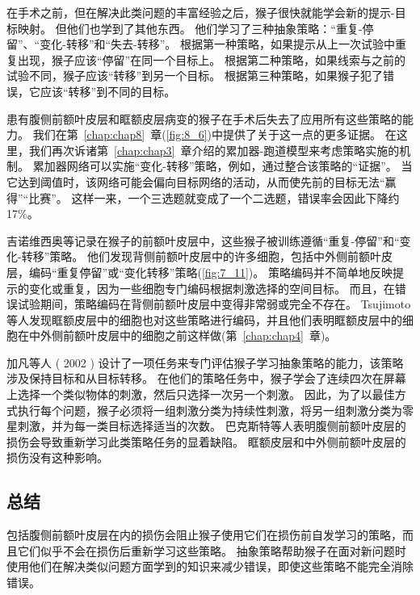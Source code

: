 在手术之前，但在解决此类问题的丰富经验之后，猴子很快就能学会新的提示-目标映射。
但他们也学到了其他东西。 他们学习了三种抽象策略：“重复-停留”、“变化-转移”和“失去-转移”。
根据第一种策略，如果提示从上一次试验中重复出现，猴子应该“停留”在同一个目标上。
根据第二种策略，如果线索与之前的试验不同，猴子应该“转移”到另一个目标。
根据第三种策略，如果猴子犯了错误，它应该“转移”到不同的目标。
\par


患有腹侧前额叶皮层和眶额皮层病变的猴子在手术后失去了应用所有这些策略的能力\cite{bussey2001role}。
我们在第~\ref{chap:chap8}~章(\ref{fig:8_6})中提供了关于这一点的更多证据。
在这里，我们再次诉诸第~\ref{chap:chap3}~章介绍的累加器-跑道模型来考虑策略实施的机制。 
累加器网络可以实施“变化-转移”策略，例如，通过整合该策略的“证据”。
当它达到阈值时，该网络可能会偏向目标网络的活动，从而使先前的目标无法“赢得”“比赛”。
这样一来，一个三选题就变成了一个二选题，错误率会因此下降约 17\%。
\par


吉诺维西奥等\cite{genovesio2005prefrontal}记录在猴子的前额叶皮层中，这些猴子被训练遵循“重复-停留”和“变化-转移”策略。
他们发现背侧前额叶皮层中的许多细胞，包括中外侧前额叶皮层，编码“重复停留”或“变化转移”策略(\ref{fig:7_11})。
策略编码并不简单地反映提示的变化或重复，因为一些细胞专门编码根据刺激选择的空间目标。
而且，在错误试验期间，策略编码在背侧前额叶皮层中变得非常弱或完全不存在\cite{genovesio2008encoding}。
Tsujimoto 等人\cite{tsujimoto2011comparison}发现眶额皮层中的细胞也对这些策略进行编码，并且他们表明眶额皮层中的细胞在中外侧前额叶皮层中的细胞之前这样做(第~\ref{chap:chap4}~章)。
\par 


加凡等人 ( 2002 ) 设计了一项任务来专门评估猴子学习抽象策略的能力，该策略涉及保持目标和从目标转移。
在他们的策略任务中，猴子学会了连续四次在屏幕上选择一个类似物体的刺激，然后只选择一次另一个刺激。
因此，为了以最佳方式执行每个问题，猴子必须将一组刺激分类为持续性刺激，将另一组刺激分类为零星刺激，并为每一类目标选择适当的次数。 
巴克斯特等人\cite{baxter2009ventrolateral}表明腹侧前额叶皮层的损伤会导致重新学习此类策略任务的显着缺陷。 
眶额皮层\cite{baxter2007orbital}和中外侧前额叶皮层\cite{baxter2008dorsolateral}的损伤没有这种影响。



\subsection{总结}
\par 
包括腹侧前额叶皮层在内的损伤会阻止猴子使用它们在损伤前自发学习的策略，而且它们似乎不会在损伤后重新学习这些策略。
抽象策略帮助猴子在面对新问题时使用他们在解决类似问题方面学到的知识来减少错误，即使这些策略不能完全消除错误。



